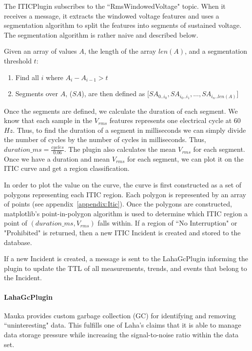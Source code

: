 The ITICPlugin subscribes to the ``RmsWindowedVoltage" topic. When it receives a message, it extracts the windowed voltage features and uses a segmentation algorithm to split the features into segments of sustained voltage. The segmentation algorithm is rather naive and described below.

Given an array of values $A$, the length of the array $len(A)$, and a segmentation threshold $t$:
\begin{enumerate}
	\item Find all $i$ where $A_i - A_{i-1} > t$
	\item Segments over $A$, ($SA$), are then defined as [$SA_{0..i_0}, SA_{i_0..i_1}, \dots, SA_{i_n..len(A)}$]
\end{enumerate}

Once the segments are defined, we calculate the duration of each segment. We know that each sample in the $V_{rms}$ features represents one electrical cycle at 60$Hz$. Thus, to find the duration of a segment in milliseconds we can simply divide the number of cycles by the number of cycles in milliseconds. Thus, $duration\_ms = \frac{cycles}{0.06}$. The plugin also calculates the mean $V_{rms}$ for each segment. Once we have a duration and mean $V_{rms}$ for each segment, we can plot it on the ITIC curve and get a region classification.

In order to plot the value on the curve, the curve is first constructed as a set of polygons representing each ITIC region. Each polygon is represented by an array of points (see appendix~\ref{appendix:Itic}). Once the polygons are constructed, matplotlib's point-in-polygon algorithm is used to determine which ITIC region a point of $(duration\_ms, V_{rms})$ falls within. If a region of ``No Interruption" or "Prohibited" is returned, then a new ITIC Incident is created and stored to the database.

If a new Incident is created, a message is sent to the LahaGcPlugin informing the plugin to update the TTL of all measurements, trends, and events that belong to the Incident.

\paragraph{LahaGcPlugin}\label{sec:gc_plugin}
Mauka provides custom garbage collection (GC) for identifying and removing ``uninteresting" data. This fulfills one of Laha's claims that it is able to manage data storage pressure while increasing the signal-to-noise ratio within the data set.

